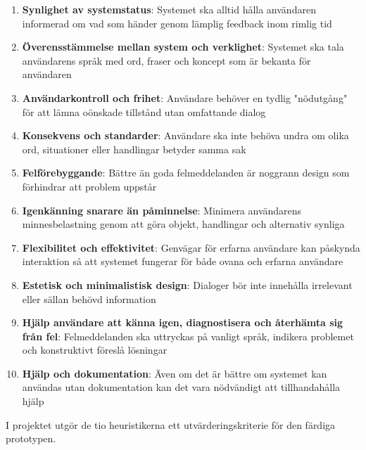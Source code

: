 \begin{enumerate}
    \item \textbf{Synlighet av systemstatus}: Systemet ska alltid hålla användaren informerad om vad som händer genom lämplig feedback inom rimlig tid
    
    \item \textbf{Överensstämmelse mellan system och verklighet}: Systemet ska tala användarens språk med ord, fraser och koncept som är bekanta för användaren
    
    \item \textbf{Användarkontroll och frihet}: Användare behöver en tydlig "nödutgång" för att lämna oönskade tillstånd utan omfattande dialog
    
    \item \textbf{Konsekvens och standarder}: Användare ska inte behöva undra om olika ord, situationer eller handlingar betyder samma sak
    
    \item \textbf{Felförebyggande}: Bättre än goda felmeddelanden är noggrann design som förhindrar att problem uppstår
    
    \item \textbf{Igenkänning snarare än påminnelse}: Minimera användarens minnesbelastning genom att göra objekt, handlingar och alternativ synliga
    
    \item \textbf{Flexibilitet och effektivitet}: Genvägar för erfarna användare kan påskynda interaktion så att systemet fungerar för både ovana och erfarna användare
    
    \item \textbf{Estetisk och minimalistisk design}: Dialoger bör inte innehålla irrelevant eller sällan behövd information
    
    \item \textbf{Hjälp användare att känna igen, diagnostisera och återhämta sig från fel}: Felmeddelanden ska uttryckas på vanligt språk, indikera problemet och konstruktivt föreslå lösningar
    
    \item \textbf{Hjälp och dokumentation}: Även om det är bättre om systemet kan användas utan dokumentation kan det vara nödvändigt att tillhandahålla hjälp
\end{enumerate}

I projektet utgör de tio heuristikerna ett utvärderingskriterie för den färdiga prototypen.

